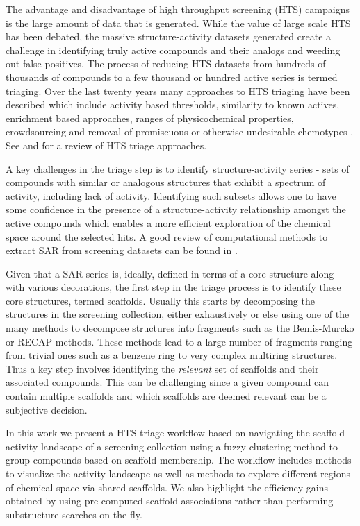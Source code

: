 \documentclass[journal=jacsat,manuscript=article]{achemso}
\begin{document}
The advantage and disadvantage of high throughput screening (HTS)
campaigns is the large amount of data that is generated. While the
value of large scale HTS has been debated\cite{Macarron:2011qv}, the
massive structure-activity datasets generated create a challenge in
identifying truly active compounds and their analogs and weeding out
false positives. The process of reducing HTS datasets from hundreds of
thousands of compounds to a few thousand or hundred active series is
termed triaging. Over the last twenty years many approaches to HTS
triaging have been described which include activity based
thresholds\cite{Mulrooney:2013aa}, similarity to known
actives\cite{Shanmugasundaram:2005aa}, enrichment based
approaches\cite{Varin2010CSE,Pu:2012wf}, ranges of physicochemical
properties\cite{Cox:2012qy}, crowdsourcing\cite{Peng:2013qp} and
removal of promiscuous or otherwise undesirable chemotypes
\cite{Dahlin:2014fp}. See \citeauthor{Shun:2011sy} and
\citeauthor{Langer:2009mw} for a review of HTS triage approaches.

A key challenges in the triage step is to identify structure-activity
series - sets of compounds with similar or analogous structures that exhibit a
spectrum of activity, including lack of activity. Identifying such subsets allows one to have some
confidence in the presence of a structure-activity relationship amongst the
active compounds which enables a more efficient exploration of the chemical
space around the selected hits. A good review of computational methods to extract SAR from screening datasets can be found in \citeauthor{Wawer2010review}. 

Given that a SAR series is, ideally, defined in terms of a core structure along
with various decorations, the first step in the triage process is to
identify these core structures, termed scaffolds. Usually this starts by
decomposing the structures in the screening collection, either exhaustively or
else using one of the many methods to decompose structures into fragments such
as the Bemis-Murcko\cite{BemisMurcko1999,BemisMurcko1996} or RECAP
methods\cite{Lewell:1998aa}. These methods lead to a large number of
fragments ranging from trivial ones such as a benzene ring to very complex
multiring structures. Thus a key step involves identifying the \emph{relevant} set of
scaffolds and their associated compounds. This can be challenging since a given
compound can contain multiple scaffolds and which scaffolds are
deemed relevant can be a subjective decision\cite{Hu:2016aa}.

In this work we present a HTS triage workflow based on navigating the
scaffold-activity landscape of a screening collection using a fuzzy
clustering method to group compounds based on scaffold membership. The
workflow includes methods to visualize the activity landscape as well
as methods to explore different regions of chemical space via shared
scaffolds. We also highlight the efficiency gains obtained by using
pre-computed scaffold associations rather than performing substructure
searches on the fly.
\end{document}
